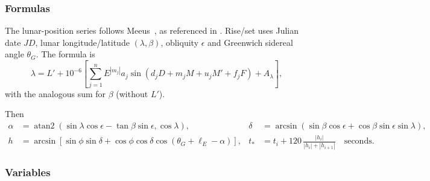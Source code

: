 \documentclass[10pt,a4paper]{amsart}
\DeclareMathOperator{\atan}{atan2}
\begin{document}
\subsubsection*{Formulas}
The lunar-position series follows Meeus~\cite[Chapter~45]{meeus1991},
as referenced in . Rise/set uses Julian date $JD$, lunar
longitude/latitude $(\lambda,\beta)$, obliquity $\epsilon$ and Greenwich
sidereal angle $\theta_G$. The formula is
\[
 \lambda=L'+10^{-6}\!\left[\sum_{j=1}^{n}E^{|m_j|}a_j
 \sin(d_jD+m_jM+u_jM'+f_jF)+A_\lambda\right],
\]
with the analogous sum for $\beta$ (without $L'$).

Then
\begin{align*}
 \alpha&=\atan(\sin\lambda\cos\epsilon-\tan\beta\sin\epsilon,\cos\lambda),&
 \delta&=\arcsin(\sin\beta\cos\epsilon+\cos\beta\sin\epsilon\sin\lambda),\\
 h&=\arcsin[\sin\phi\sin\delta+\cos\phi\cos\delta\cos(\theta_G+\ell_E-\alpha)],&
 t_*&=t_i+120\,\frac{|h_i|}{|h_i|+|h_{i+1}|}\quad\text{seconds}.
\end{align*}

\subsubsection*{Variables}
\end{document}
